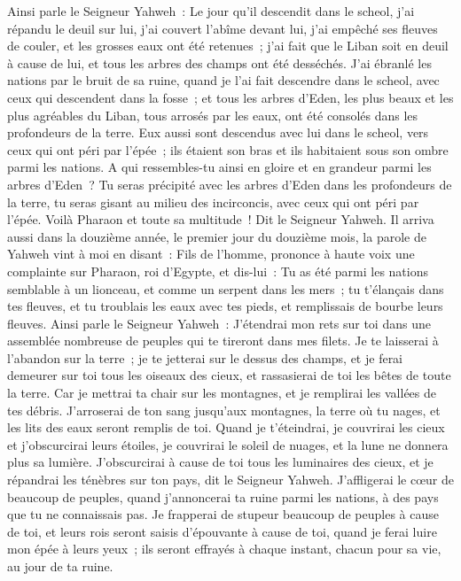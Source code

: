 \begin{multicols}{2}
Ainsi parle le Seigneur Yahweh~: Le jour qu'il descendit dans le scheol, j'ai répandu le deuil sur lui, j'ai couvert l'abîme devant lui, j'ai empêché ses fleuves de couler, et les grosses eaux ont été retenues~; j'ai fait que le Liban soit en deuil à cause de lui, et tous les arbres des champs ont été desséchés.
J'ai ébranlé les nations par le bruit de sa ruine, quand je l'ai fait descendre dans le scheol, avec ceux qui descendent dans la fosse~; et tous les arbres d'Eden, les plus beaux et les plus agréables du Liban, tous arrosés par les eaux, ont été consolés dans les profondeurs de la terre.
Eux aussi sont descendus avec lui dans le scheol, vers ceux qui ont péri par l'épée~; ils étaient son bras et ils habitaient sous son ombre parmi les nations.
A qui ressembles-tu ainsi en gloire et en grandeur parmi les arbres d'Eden~? Tu seras précipité avec les arbres d'Eden dans les profondeurs de la terre, tu seras gisant au milieu des incirconcis, avec ceux qui ont péri par l'épée. Voilà Pharaon et toute sa multitude~! Dit le Seigneur Yahweh.
\VerseOne{}Il arriva aussi dans la douzième année, le premier jour du douzième mois, la parole de Yahweh vint à moi en disant~:
Fils de l'homme, prononce à haute voix une complainte sur Pharaon, roi d'Egypte, et dis-lui~: Tu as été parmi les nations semblable à un lionceau, et comme un serpent dans les mers~; tu t'élançais dans tes fleuves, et tu troublais les eaux avec tes pieds, et remplissais de bourbe leurs fleuves.
Ainsi parle le Seigneur Yahweh~: J'étendrai mon rets sur toi dans une assemblée nombreuse de peuples qui te tireront dans mes filets.
Je te laisserai à l'abandon sur la terre~; je te jetterai sur le dessus des champs, et je ferai demeurer sur toi tous les oiseaux des cieux, et rassasierai de toi les bêtes de toute la terre.
Car je mettrai ta chair sur les montagnes, et je remplirai les vallées de tes débris.
J'arroserai de ton sang jusqu'aux montagnes, la terre où tu nages, et les lits des eaux seront remplis de toi.
Quand je t'éteindrai, je couvrirai les cieux et j'obscurcirai leurs étoiles, je couvrirai le soleil de nuages, et la lune ne donnera plus sa lumière.
J'obscurcirai à cause de toi tous les luminaires des cieux, et je répandrai les ténèbres sur ton pays, dit le Seigneur Yahweh.
J'affligerai le cœur de beaucoup de peuples, quand j'annoncerai ta ruine parmi les nations, à des pays que tu ne connaissais pas.
Je frapperai de stupeur beaucoup de peuples à cause de toi, et leurs rois seront saisis d'épouvante à cause de toi, quand je ferai luire mon épée à leurs yeux~; ils seront effrayés à chaque instant, chacun pour sa vie, au jour de ta ruine.

\end{multicols}
